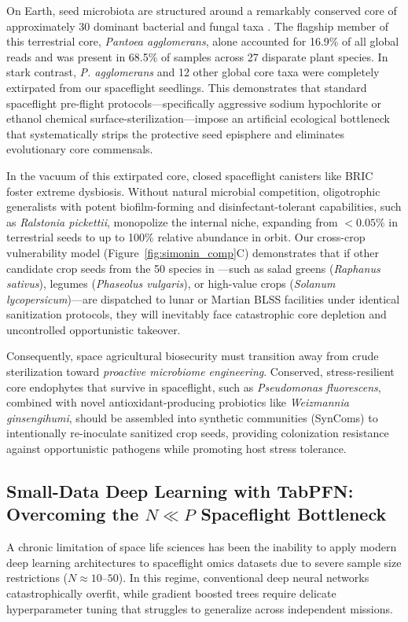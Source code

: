 On Earth, seed microbiota are structured around a remarkably conserved core of approximately 30 dominant bacterial and fungal taxa \citep{simonin2022seed}. The flagship member of this terrestrial core, \textit{Pantoea agglomerans}, alone accounted for 16.9\% of all global reads and was present in 68.5\% of samples across 27 disparate plant species. In stark contrast, \textit{P. agglomerans} and 12 other global core taxa were completely extirpated from our spaceflight seedlings. This demonstrates that standard spaceflight pre-flight protocols—specifically aggressive sodium hypochlorite or ethanol chemical surface-sterilization—impose an artificial ecological bottleneck that systematically strips the protective seed episphere and eliminates evolutionary core commensals.

In the vacuum of this extirpated core, closed spaceflight canisters like BRIC foster extreme dysbiosis. Without natural microbial competition, oligotrophic generalists with potent biofilm-forming and disinfectant-tolerant capabilities, such as \textit{Ralstonia pickettii}, monopolize the internal niche, expanding from $<0.05\%$ in terrestrial seeds to up to 100\% relative abundance in orbit. Our cross-crop vulnerability model (Figure~\ref{fig:simonin_comp}C) demonstrates that if other candidate crop seeds from the 50 species in \citet{simonin2022seed}—such as salad greens (\textit{Raphanus sativus}), legumes (\textit{Phaseolus vulgaris}), or high-value crops (\textit{Solanum lycopersicum})—are dispatched to lunar or Martian BLSS facilities under identical sanitization protocols, they will inevitably face catastrophic core depletion and uncontrolled opportunistic takeover.

Consequently, space agricultural biosecurity must transition away from crude sterilization toward \textit{proactive microbiome engineering}. Conserved, stress-resilient core endophytes that survive in spaceflight, such as \textit{Pseudomonas fluorescens}, combined with novel antioxidant-producing probiotics like \textit{Weizmannia ginsengihumi}, should be assembled into synthetic communities (SynComs) to intentionally re-inoculate sanitized crop seeds, providing colonization resistance against opportunistic pathogens while promoting host stress tolerance.

\subsection{Small-Data Deep Learning with TabPFN: Overcoming the \texorpdfstring{$N \ll P$}{N << P} Spaceflight Bottleneck}
A chronic limitation of space life sciences has been the inability to apply modern deep learning architectures to spaceflight omics datasets due to severe sample size restrictions ($N \approx 10$--$50$). In this regime, conventional deep neural networks catastrophically overfit, while gradient boosted trees require delicate hyperparameter tuning that struggles to generalize across independent missions.

